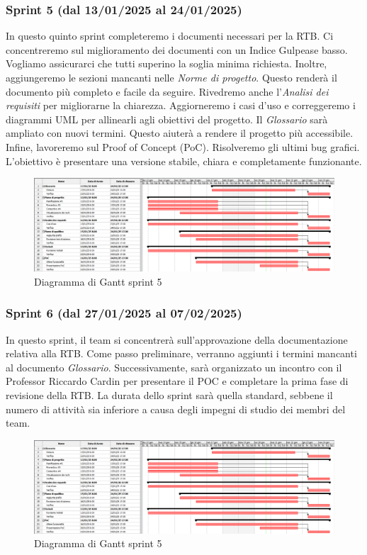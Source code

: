         \subsubsection{Sprint 5 (dal 13/01/2025 al 24/01/2025)}
        In questo quinto sprint completeremo i documenti necessari per la RTB.
        Ci concentreremo sul miglioramento dei documenti con un Indice Gulpease basso. Vogliamo assicurarci che tutti superino la soglia minima richiesta.
        Inoltre, aggiungeremo le sezioni mancanti nelle \textit{Norme di progetto}. Questo renderà il documento più completo e facile da seguire.
        Rivedremo anche l'\textit{Analisi dei requisiti} per migliorarne la chiarezza. Aggiorneremo i casi d'uso e correggeremo i diagrammi UML per allinearli agli obiettivi del progetto.
        Il \textit{Glossario} sarà ampliato con nuovi termini. Questo aiuterà a rendere il progetto più accessibile.
        Infine, lavoreremo sul Proof of Concept (PoC). Risolveremo gli ultimi bug grafici. L'obiettivo è presentare una versione stabile, chiara e completamente funzionante.
                
        \begin{figure}[h!]
            \centering
            \includegraphics[scale = 0.4]{template/images/gantt5.png}
            \caption{Diagramma di Gantt sprint 5}
            \label{fig:3.4} %
        \end{figure}

        \subsubsection{Sprint 6 (dal 27/01/2025 al 07/02/2025)}
        In questo sprint, il team si concentrerà sull'approvazione della documentazione relativa alla RTB. 
        Come passo preliminare, verranno aggiunti i termini mancanti al documento \textit{Glossario}.
        Successivamente, sarà organizzato un incontro con il Professor Riccardo Cardin per presentare il POC e completare la prima fase di revisione della RTB. 
        La durata dello sprint sarà quella standard, sebbene il numero di attività sia inferiore a causa degli impegni di studio dei membri del team.
                
        \begin{figure}[h!]
            \centering
            \includegraphics[scale = 0.4]{template/images/gantt5.png}
            \caption{Diagramma di Gantt sprint 5}
            \label{fig:3.4} %
        \end{figure}

 
